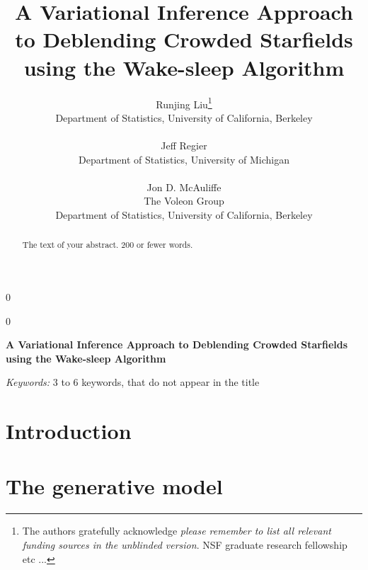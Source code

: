 \documentclass[12pt]{article}
\newcommand{\blind}{0}
\begin{document}
%

\def\spacingset#1{\renewcommand{\baselinestretch}%
{#1}\small\normalsize} \spacingset{1}


\blind
{
  \title{\bf  A Variational Inference Approach to Deblending Crowded Starfields using the Wake-sleep Algorithm}
  \author{Runjing Liu\thanks{
    The authors gratefully acknowledge \textit{please remember to list all relevant funding sources in the unblinded version}. NSF graduate research fellowship etc ... }\hspace{.2cm}\\
    Department of Statistics, University of California, Berkeley\\
    \\
    Jeff Regier \\
    Department of Statistics, University of Michigan\\
    \\
    Jon D. McAuliffe \\
    The Voleon Group \\
    Department of Statistics, University of California, Berkeley}
  \maketitle
} \fi

\blind
{
  \bigskip
  \bigskip
  \bigskip
  \begin{center}
    {\LARGE\bf A Variational Inference Approach to Deblending Crowded Starfields using the Wake-sleep Algorithm}
\end{center}
  \medskip
} \fi

\bigskip
\begin{abstract}
The text of your abstract. 200 or fewer words.
\end{abstract}

\noindent%
{\it Keywords:}  3 to 6 keywords, that do not appear in the title
\vfill

\newpage
\spacingset{1.45} %
\section{Introduction}
\label{sec:intro}


\section{The generative model}
\label{sec:gen_model}

\end{document}
